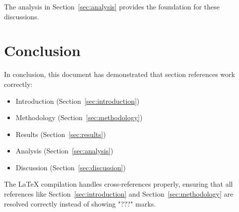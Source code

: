 \documentclass{article}
\begin{document}
The analysis in Section~\ref{sec:analysis} provides the foundation for these discussions.

\section{Conclusion}
\label{sec:conclusion}

In conclusion, this document has demonstrated that section references work correctly:
\begin{itemize}
    \item Introduction (Section~\ref{sec:introduction})
    \item Methodology (Section~\ref{sec:methodology})
    \item Results (Section~\ref{sec:results})
    \item Analysis (Section~\ref{sec:analysis})
    \item Discussion (Section~\ref{sec:discussion})
\end{itemize}

The LaTeX compilation handles cross-references properly, ensuring that all references like Section~\ref{sec:introduction} and Section~\ref{sec:methodology} are resolved correctly instead of showing "???" marks.
\end{document}

